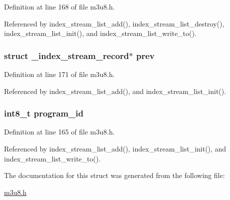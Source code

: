 \-Definition at line 168 of file m3u8.\-h.



\-Referenced by index\-\_\-stream\-\_\-list\-\_\-add(), index\-\_\-stream\-\_\-list\-\_\-destroy(), index\-\_\-stream\-\_\-list\-\_\-init(), and index\-\_\-stream\-\_\-list\-\_\-write\-\_\-to().

\hypertarget{struct_index_stream_record_a8bd73ff6ff04390035db860b0541b819}{
\subsubsection[{prev}]{\setlength{\rightskip}{0pt plus 5cm}struct \-\_\-index\-\_\-stream\-\_\-record$\ast$ {\bf prev}}}\label{struct_index_stream_record_a8bd73ff6ff04390035db860b0541b819}


\-Definition at line 171 of file m3u8.\-h.



\-Referenced by index\-\_\-stream\-\_\-list\-\_\-add(), and index\-\_\-stream\-\_\-list\-\_\-init().

\hypertarget{struct_index_stream_record_a3a9354735383f94a70b6bf5df89ce6a7}{
\subsubsection[{program\-\_\-id}]{\setlength{\rightskip}{0pt plus 5cm}int8\-\_\-t {\bf program\-\_\-id}}}\label{struct_index_stream_record_a3a9354735383f94a70b6bf5df89ce6a7}


\-Definition at line 165 of file m3u8.\-h.



\-Referenced by index\-\_\-stream\-\_\-list\-\_\-add(), index\-\_\-stream\-\_\-list\-\_\-init(), and index\-\_\-stream\-\_\-list\-\_\-write\-\_\-to().



\-The documentation for this struct was generated from the following file\-:\begin{DoxyCompactItemize}
\item 
\hyperlink{m3u8_8h}{m3u8.\-h}\end{DoxyCompactItemize}
